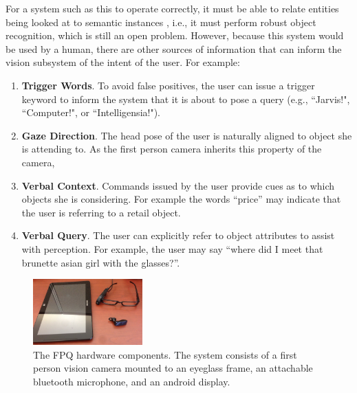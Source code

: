 \documentclass{llncs}
\begin{document}
For a system such as this to operate correctly, it must be able to relate entities being looked at to semantic instances , i.e., it must perform robust object recognition, which is still an open problem. However, because this system would be used by a human, there are other sources of information that can inform the vision subsystem of the intent of the user. For example:
\begin{enumerate}
\item
\textbf{Trigger Words}. To avoid false positives, the user can issue a trigger keyword to inform the system that it is about to pose a query (e.g., ``Jarvis!", ``Computer!", or ``Intelligensia!"). 
\item
\textbf{Gaze Direction}. The head pose of the user is naturally aligned to object she is attending to. As the first person camera inherits this property of the camera, 
\item
\textbf{Verbal Context}. Commands issued by the user provide cues as to which objects she is considering. For example the words ``price''  may indicate that the user is referring to a retail object. 
\item
\textbf{Verbal Query}. The user can explicitly refer to object attributes to assist with perception. For example, the user may say ``where did I meet that brunette asian girl with the glasses?''.
\end{enumerate}
\begin{figure}
\includegraphics[height=1in]{fig/mmfps_components.jpg}
\caption{The FPQ hardware components. The system consists of a first person vision camera mounted to an eyeglass frame, an attachable bluetooth microphone, and an android display.}
\label{fig:mmfps-hardware}
\end{figure}
\end{document}
